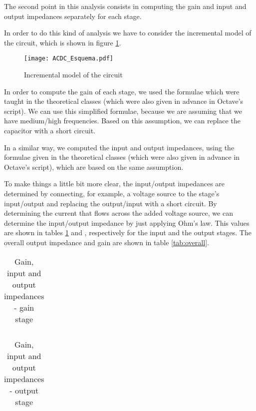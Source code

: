 \par The second point in this analysis consists in computing the gain and input and output impedances separately for each stage.
\par In order to do this kind of analysis we have to consider the incremental model of the circuit, which is shown in figure \ref{fig:3}.

\begin{figure}[H] \centering
	\texttt{[image: ACDC\_Esquema.pdf]}
	\caption{Incremental model of the circuit}
	\label{fig:3}
\end{figure}

\par In order to compute the gain of each stage, we used the formulae which were taught in the theoretical classes (which were also given in advance in Octave's script). We can use this simplified formulae, because we are assuming that we have medium/high frequencies. Based on this assumption, we can replace the capacitor with a short circuit.
\par In a similar way, we computed the input and output impedances, using the formulae given in the theoretical classes (which were also given in advance in Octave's script), which are based on the same assumption.
\par To make things a little bit more clear, the input/output impedances are determined by connecting, for example, a voltage source to the stage's input/output and replacing the output/input with a short circuit. By determining the current that flows across the added voltage source, we can determine the input/output impedance by just applying Ohm's law. This values are shown in tables \ref{tab:stage1} and \label{tab:stage2}, respectively for the input and the output stages. The overall output impedance and gain are shown in table \ref{tab:overall}.

\vspace{5mm}
\begin{table}[H]
	\centering
	\begin{tabularx}{0.9\textwidth} {
 	    | >{\raggedright\arraybackslash}X
  	    | >{\raggedleft\arraybackslash}X | }
	\hline
	
	\end{tabularx}
	\caption{Gain, input and output impedances - gain stage}
	\label{tab:stage1}
\end{table}
\vspace{5mm}

\begin{table}[H]
	\centering
	\begin{tabularx}{0.9\textwidth} {
 	    | >{\raggedright\arraybackslash}X
  	    | >{\raggedleft\arraybackslash}X | }
	\hline
	
	\end{tabularx}
	\caption{Gain, input and output impedances - output stage}
	\label{tab:stage2}
\end{table}
\vspace{5mm}


